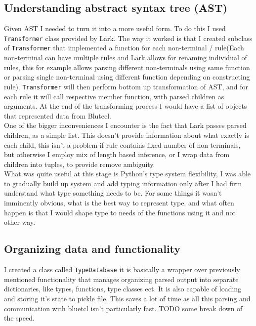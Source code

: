 \documentclass[14pt]{report}
\begin{document}
\subsection{Understanding abstract syntax tree (AST)}
Given AST I needed to turn it into a more useful form. To do this I used \verb!Transformer! class provided by Lark. The way it worked is that I created subclass of \verb!Transformer! that implemented a function for each non-terminal / rule(Each non-terminal can have multiple rules and Lark allows for renaming individual of rules, this for example allows parsing different non-terminals using same function or parsing single non-terminal using different function depending on constructing rule). \verb!Transformer! will then perform bottom up transformation of AST, and for each rule it will call respective member function, with parsed children as arguments. At the end of the transforming process I would have a list of objects that represented data from Blutecl.
\\
One of the bigger inconveniences I encounter is the fact that Lark passes parsed children, as a simple list. This doesn't provide information about what exactly is each child, this isn't a problem if rule contains fixed number of non-terminals, but otherwise I employ mix of length based inference, or I wrap data from children into tuples, to provide remove ambiguity.
\\
What was quite useful at this stage is Python's type system flexibility, I was able to gradually build up system and add typing information only after I had firm understand what type something needs to be. For some things it wasn't imminently obvious, what is the best way to represent type, and what often happen is that I would shape type to needs of the functions using it and not other way. 

\subsection{Organizing data and functionality}
I created a class called \verb!TypeDatabase! it is basically a wrapper over previously mentioned functionality that manages organizing parsed output into separate dictionaries, like types, functions, type classes ect. It is also capable of loading and storing it's state to pickle file. This saves a lot of time as all this parsing and communication with bluetcl isn't particularly fast. TODO some break down of the speed.
\end{document}
